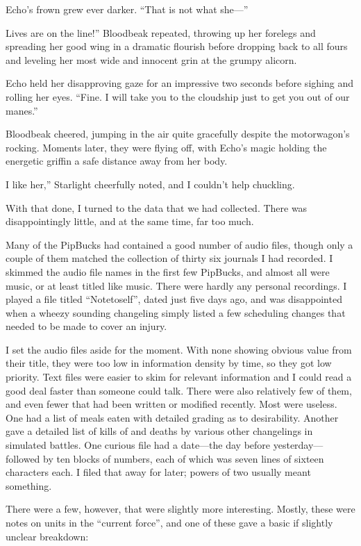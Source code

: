 Echo’s frown grew ever darker. “That is not what she—”

\leavevmode{}Lives are on the line!” Bloodbeak repeated, throwing up her forelegs and spreading her good wing in a dramatic flourish before dropping back to all fours and leveling her most wide and innocent grin at the grumpy alicorn.

Echo held her disapproving gaze for an impressive two seconds before sighing and rolling her eyes. “Fine. I will take you to the cloudship just to get you out of our manes.”

Bloodbeak cheered, jumping in the air quite gracefully despite the motorwagon’s rocking. Moments later, they were flying off, with Echo’s magic holding the energetic griffin a safe distance away from her body.

\leavevmode{}I like her,” Starlight cheerfully noted, and I couldn’t help chuckling.

With that done, I turned to the data that we had collected. There was disappointingly little, and at the same time, far too much.

Many of the PipBucks had contained a good number of audio files, though only a couple of them matched the collection of thirty six journals I had recorded. I skimmed the audio file names in the first few PipBucks, and almost all were music, or at least titled like music. There were hardly any personal recordings. I played a file titled “Notetoself”, dated just five days ago, and was disappointed when a wheezy sounding changeling simply listed a few scheduling changes that needed to be made to cover an injury.

I set the audio files aside for the moment. With none showing obvious value from their title, they were too low in information density by time, so they got low priority. Text files were easier to skim for relevant information and I could read a good deal faster than someone could talk. There were also relatively few of them, and even fewer that had been written or modified recently. Most were useless. One had a list of meals eaten with detailed grading as to desirability. Another gave a detailed list of kills of and deaths by various other changelings in simulated battles. One curious file had a date—the day before yesterday—followed by ten blocks of numbers, each of which was seven lines of sixteen characters each. I filed that away for later; powers of two usually meant something.

There were a few, however, that were slightly more interesting. Mostly, these were notes on units in the “current force”, and one of these gave a basic if slightly unclear breakdown:

